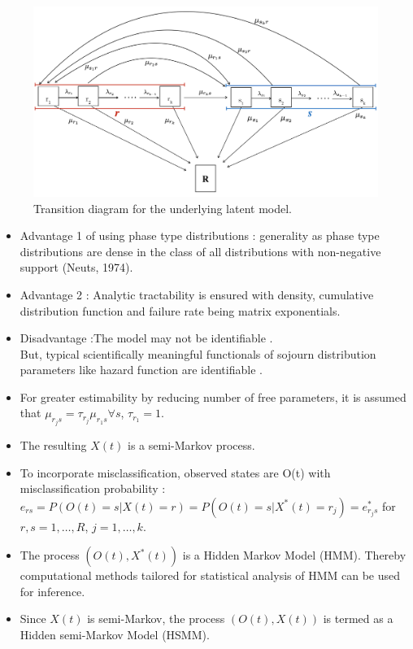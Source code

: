 \documentclass{beamer}
\begin{document}
\begin{frame}
\begin{figure}
\includegraphics[scale=0.4]{coxmodelstitched2.png}
\caption{Transition diagram for the underlying latent model.}
\end{figure}
\end{frame}
\begin{frame}
\begin{itemize}
\item Advantage 1 of using phase type distributions :  generality as phase type distributions are dense in the class of all distributions with non-negative support (Neuts, 1974). 
\item Advantage 2 : Analytic tractability is ensured with density, cumulative distribution function and failure rate being matrix exponentials.
\item Disadvantage :The model may not be identifiable \citep{asmussen1996fitting}. \\ \vspace{2mm}But, typical scientifically meaningful functionals of sojourn distribution parameters like hazard function are identifiable \citep{bladt2003estimation}.
\end{itemize}
\end{frame}
\begin{frame}
\begin{itemize}
\item For greater estimability by reducing number of free parameters, it is assumed that $\mu_{r_j s} = \tau_{r_j} \mu_{r_1 s} \forall s$, $\tau_{r_1}=1$. %
\item The resulting $X(t)$ is a semi-Markov process.
\item To incorporate misclassification, observed states are O(t) with misclassification probability : $e_{rs}=P(O(t)=s|X(t) =r)=P(O(t)=s|X^* (t) =r_j)= e^*_{r_j s}$ for $r,s = 1,\ldots,R$, $j=1,\ldots, k$. 
\item The process $(O(t), X^*(t))$ is a Hidden Markov Model (HMM). Thereby computational methods tailored for statistical analysis of HMM can be used for inference.
\item Since $X(t)$ is semi-Markov, the process $(O(t),X(t))$ is termed as a Hidden semi-Markov Model (HSMM).

\end{itemize}
\end{frame}
\end{document}
